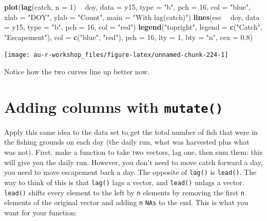 \documentclass[]{book}
\newenvironment{Shaded}{\begin{snugshade}}{\end{snugshade}}
\newcommand{\KeywordTok}[1]{\textcolor[rgb]{0.13,0.29,0.53}{\textbf{#1}}}
\newcommand{\DataTypeTok}[1]{\textcolor[rgb]{0.13,0.29,0.53}{#1}}
\newcommand{\DecValTok}[1]{\textcolor[rgb]{0.00,0.00,0.81}{#1}}
\newcommand{\FloatTok}[1]{\textcolor[rgb]{0.00,0.00,0.81}{#1}}
\newcommand{\StringTok}[1]{\textcolor[rgb]{0.31,0.60,0.02}{#1}}
\newcommand{\OperatorTok}[1]{\textcolor[rgb]{0.81,0.36,0.00}{\textbf{#1}}}
\newcommand{\NormalTok}[1]{#1}
\theoremstyle{definition}
\theoremstyle{definition}
\theoremstyle{definition}
\theoremstyle{remark}
\begin{document}
\begin{Shaded}
\begin{Highlighting}[]
\KeywordTok{plot}\NormalTok{(}\KeywordTok{lag}\NormalTok{(catch, }\DataTypeTok{n =} \DecValTok{1}\NormalTok{) }\OperatorTok{~}\StringTok{ }\NormalTok{doy, }\DataTypeTok{data =}\NormalTok{ y15, }\DataTypeTok{type =} \StringTok{"b"}\NormalTok{, }\DataTypeTok{pch =} \DecValTok{16}\NormalTok{, }\DataTypeTok{col =} \StringTok{"blue"}\NormalTok{,}
     \DataTypeTok{xlab =} \StringTok{"DOY"}\NormalTok{, }\DataTypeTok{ylab =} \StringTok{"Count"}\NormalTok{, }\DataTypeTok{main =} \StringTok{"With lag(catch)"}\NormalTok{)}
\KeywordTok{lines}\NormalTok{(esc }\OperatorTok{~}\StringTok{ }\NormalTok{doy, }\DataTypeTok{data =}\NormalTok{ y15, }\DataTypeTok{type =} \StringTok{"b"}\NormalTok{, }\DataTypeTok{pch =} \DecValTok{16}\NormalTok{, }\DataTypeTok{col =} \StringTok{"red"}\NormalTok{)}
\KeywordTok{legend}\NormalTok{(}\StringTok{"topright"}\NormalTok{, }\DataTypeTok{legend =} \KeywordTok{c}\NormalTok{(}\StringTok{"Catch"}\NormalTok{, }\StringTok{"Escapement"}\NormalTok{),}
       \DataTypeTok{col =} \KeywordTok{c}\NormalTok{(}\StringTok{"blue"}\NormalTok{, }\StringTok{"red"}\NormalTok{), }\DataTypeTok{pch =} \DecValTok{16}\NormalTok{, }\DataTypeTok{lty =} \DecValTok{1}\NormalTok{, }\DataTypeTok{bty =} \StringTok{"n"}\NormalTok{, }\DataTypeTok{cex =} \FloatTok{0.8}\NormalTok{)}
\end{Highlighting}
\end{Shaded}

\begin{center}\texttt{[image: au-r-workshop\_files/figure-latex/unnamed-chunk-224-1]} \end{center}

Notice how the two curves line up better now.

\section{\texorpdfstring{Adding columns with
\texttt{mutate()}}{Adding columns with mutate()}}\label{adding-columns-with-mutate}

Apply this same idea to the data set to get the total number of fish
that were in the fishing grounds on each day (the daily run, what was
harvested plus what was not). First, make a function to take two
vectors, lag one, then sum them: this will give you the daily run.
However, you don't need to move catch forward a day, you need to move
escapement back a day. The opposite of \texttt{lag()} is
\texttt{lead()}. The way to think of this is that \texttt{lag()} lags a
vector, and \texttt{lead()} unlags a vector. \texttt{lead()} shifts
every element to the left by \texttt{n} elements by removing the first
\texttt{n} elements of the original vector and adding \texttt{n}
\texttt{NAs} to the end. This is what you want for your function:
\end{document}
